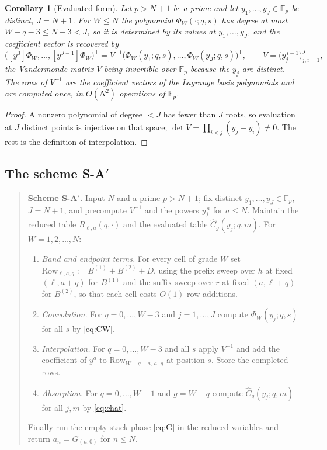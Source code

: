 \documentclass[11pt,reqno]{amsart}
\newtheorem{corollary}[theorem]{Corollary}
\theoremstyle{definition}
\theoremstyle{remark}
\newcommand{\Chat}{\widehat C}
\begin{document}
\begin{corollary}[Evaluated form]\label{cor:evaluation}
Let $p>N+1$ be a prime and let $y_1,\ldots,y_J\in\mathbb F_p$ be distinct,
$J=N+1$.  For $W\leq N$ the polynomial $\Phi_W(\cdot;q,s)$ has degree at most
$W-q-3\leq N-3<J$, so it is determined by its values at
$y_1,\ldots,y_J$, and the coefficient vector is recovered by
\[
 \bigl([y^0]\Phi_W,\ldots,[y^{J-1}]\Phi_W\bigr)^{\mathsf T}
 =V^{-1}\bigl(\Phi_W(y_1;q,s),\ldots,\Phi_W(y_J;q,s)\bigr)^{\mathsf T},
 \qquad V=\bigl(y_j^{\,i-1}\bigr)_{j,i=1}^{J},
\]
the Vandermonde matrix $V$ being invertible over $\mathbb F_p$ because the
$y_j$ are distinct.  The rows of $V^{-1}$ are the coefficient vectors of the
Lagrange basis polynomials and are computed once, in $O(N^2)$ operations of
$\mathbb F_p$.
\end{corollary}

\begin{proof}
A nonzero polynomial of degree $<J$ has fewer than $J$ roots, so evaluation
at $J$ distinct points is injective on that space; $\det V=\prod_{i<j}
(y_j-y_i)\ne0$.  The rest is the definition of interpolation.
\end{proof}

\subsection{The scheme S-A$'$}

\begin{quote}\small
\textbf{Scheme S-A$'$.}  Input $N$ and a prime $p>N+1$; fix distinct
$y_1,\ldots,y_J\in\mathbb F_p$, $J=N+1$, and precompute $V^{-1}$ and the
powers $y_j^{\,a}$ for $a\leq N$.  Maintain the reduced table
$R_{\ell,a}(q,\cdot)$ and the evaluated table
$\Chat_g(y_j;q,m)$.  For $W=1,2,\ldots,N$:
\begin{enumerate}
\item[(1)] \emph{Band and endpoint terms.}  For every cell of grade $W$ set
$\mathrm{Row}_{\ell,a,q}:=B^{(1)}+B^{(2)}+D$, using the prefix sweep over
$h$ at fixed $(\ell,a+q)$ for $B^{(1)}$ and the suffix sweep over $r$ at
fixed $(a,\ell+q)$ for $B^{(2)}$, so that each cell costs $O(1)$ row
additions.
\item[(2)] \emph{Convolution.}  For $q=0,\ldots,W-3$ and $j=1,\ldots,J$
compute $\Phi_W(y_j;q,s)$ for all $s$ by \eqref{eq:CW}.
\item[(3)] \emph{Interpolation.}  For $q=0,\ldots,W-3$ and all $s$ apply
$V^{-1}$ and add the coefficient of $y^a$ to
$\mathrm{Row}_{W-q-a,\,a,\,q}$ at position $s$.  Store the completed rows.
\item[(4)] \emph{Absorption.}  For $q=0,\ldots,W-1$ and $g=W-q$ compute
$\Chat_g(y_j;q,m)$ for all $j,m$ by \eqref{eq:chat}.
\end{enumerate}
Finally run the empty-stack phase \eqref{eq:G} in the reduced variables and
return $a_n=G_{(n,0)}$ for $n\leq N$.
\end{quote}
\end{document}
